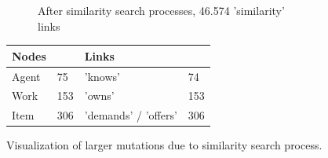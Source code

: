 \documentclass{article}
\begin{document}
\begin{figure}[H]
\begin{subfigure}{0.45\textwidth}
        \caption{After similarity search processes, 46.574 'similarity' links}
        \label{fig:larger-after-processes}
    \end{subfigure}
    \scriptsize
    \begin{tabular}{ | L{2 cm}  L{0.5 cm} | L{3 cm}  L{0.5 cm} | }
    \hline
    \textbf{Nodes} &  & \textbf{Links} &   \\ \hline
    Agent & 75 & 'knows' & 74  \\ \hline
    Work & 153 & 'owns' & 153 \\ \hline
    Item & 306 & 'demands' / 'offers' & 306 \\ \hline
    \end{tabular}

    \caption{Visualization of larger mutations due to similarity search process.}
    \label{fig:graph-mutations-similarity-search}
\end{figure}
\end{document}
